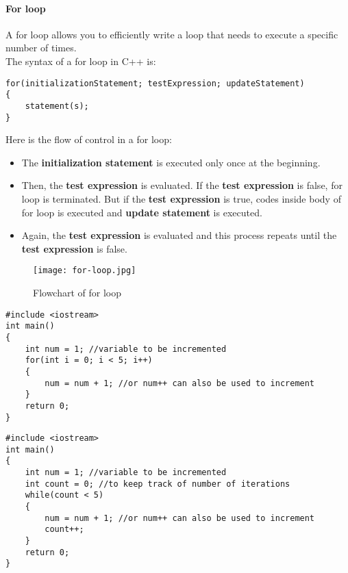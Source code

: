 \documentclass[11pt,fleqn]{book} %
\begin{document}
\paragraph{For loop}
A for loop allows you to efficiently write a loop that needs to execute a specific number of times. ~\\
The syntax of a for loop in C++ is:
\begin{lstlisting}
for(initializationStatement; testExpression; updateStatement) 
{
	statement(s); 
}
\end{lstlisting}
Here is the flow of control in a for loop:
\begin{itemize}
\item The \textbf{initialization statement} is executed only once at the beginning.
\item Then, the \textbf{test expression} is evaluated.
If the \textbf{test expression} is false, for loop is terminated. But if the \textbf{test expression} is true, codes inside body of for loop is executed and \textbf{update statement} is executed.
\item Again, the \textbf{test expression} is evaluated and this process repeats until the \textbf{test expression} is false.
\end{itemize}
\begin{figure}[H]
	\centering
	\texttt{[image: for-loop.jpg]}
	\caption{Flowchart of for loop}
\end{figure}
\begin{example}
	\begin{lstlisting}[title={Using For loop to increment an integer 5 times}, captionpos=b]
#include <iostream>
int main()
{
	int num = 1; //variable to be incremented
	for(int i = 0; i < 5; i++)
	{
		num = num + 1; //or num++ can also be used to increment
	}
	return 0;
}
\end{lstlisting}
\end{example}

\begin{example}
\begin{lstlisting}[title={Using While loop to increment an integer 5 times}, captionpos=b]
#include <iostream>
int main()
{
	int num = 1; //variable to be incremented
	int count = 0; //to keep track of number of iterations
	while(count < 5)
	{
		num = num + 1; //or num++ can also be used to increment
		count++;
	}
	return 0;
}
\end{lstlisting}
\end{example}
\newpage

\newpage
\end{document}
